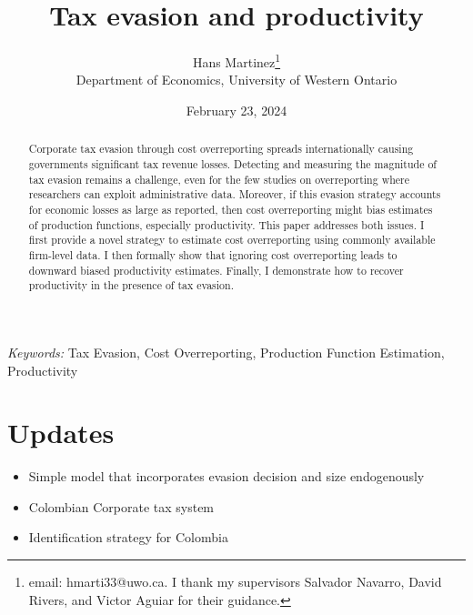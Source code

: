 \documentclass[
  12pt]{article}
\providecommand{\tightlist}{%
  \setlength{\itemsep}{0pt}\setlength{\parskip}{0pt}}\usepackage{longtable,booktabs,array}
\begin{document}
\def\spacingset#1{\renewcommand{\baselinestretch}%
{#1}\small\normalsize} \spacingset{1}



\date{February 23, 2024}
\title{\bf Tax evasion and productivity}
\author{
Hans Martinez\thanks{email: hmarti33@uwo.ca. I thank my supervisors
Salvador Navarro, David Rivers, and Victor Aguiar for their guidance.}\\
Department of Economics, University of Western Ontario\\
}
\maketitle

\bigskip
\bigskip
\begin{abstract}
Corporate tax evasion through cost overreporting spreads internationally
causing governments significant tax revenue losses. Detecting and
measuring the magnitude of tax evasion remains a challenge, even for the
few studies on overreporting where researchers can exploit
administrative data. Moreover, if this evasion strategy accounts for
economic losses as large as reported, then cost overreporting might bias
estimates of production functions, especially productivity. This paper
addresses both issues. I first provide a novel strategy to estimate cost
overreporting using commonly available firm-level data. I then formally
show that ignoring cost overreporting leads to downward biased
productivity estimates. Finally, I demonstrate how to recover
productivity in the presence of tax evasion.
\end{abstract}

\noindent%
{\it Keywords:} Tax Evasion, Cost Overreporting, Production Function
Estimation, Productivity
\vfill

\newpage
\spacingset{1.9} %

\section*{Updates}\label{updates}

\begin{itemize}
\tightlist
\item
  Simple model that incorporates evasion decision and size endogenously
\item
  Colombian Corporate tax system
\item
  Identification strategy for Colombia
\end{itemize}
\end{document}
